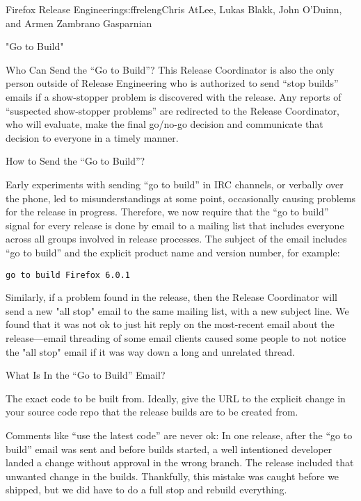 \begin{aosachapter}{Firefox Release Engineering}{s:ffreleng}{Chris AtLee, Lukas Blakk, John O'Duinn, and Armen Zambrano Gasparnian}
\begin{aosasect1}{"Go to Build"}
\begin{aosasect2}{Who Can Send the ``Go to Build''?}
This Release Coordinator is also the only person outside of Release
Engineering who is authorized to send ``stop builds'' emails if a
show-stopper problem is discovered with the release. Any reports of
``suspected show-stopper problems'' are redirected to the Release
Coordinator, who will evaluate, make the final go/no-go decision and
communicate that decision to everyone in a timely manner.

\end{aosasect2}

\begin{aosasect2}{How to Send the ``Go to Build''?}

Early experiments with sending ``go to build'' in IRC channels, or
verbally over the phone, led to misunderstandings at some point,
occasionally causing problems for the release in progress. Therefore,
we now require that the ``go to build'' signal for every release is
done by email to a mailing list that includes everyone across all
groups involved in release processes. The subject of the email
includes ``go to build'' and the explicit product name and version
number, for example:

\begin{verbatim}
go to build Firefox 6.0.1
\end{verbatim}

Similarly, if a problem found in the release, then the Release
Coordinator will send a new "all stop" email to the same mailing list,
with a new subject line. We found that it was not ok to just hit reply
on the most-recent email about the release---email threading of some
email clients caused some people to not notice the "all stop" email if
it was way down a long and unrelated thread.

\end{aosasect2}

\begin{aosasect2}{What Is In the ``Go to Build'' Email?}

\begin{aosaenumerate}

\item The exact code to be built from. Ideally, give the URL to the
explicit change in your source code repo that the release builds are
to be created from.

  \begin{aosaenumerate}

    \item Comments like ``use the latest code'' are never ok: In one
      release, after the ``go to build'' email was sent and before
      builds started, a well intentioned developer landed a change
      without approval in the wrong branch. The release included that
      unwanted change in the builds. Thankfully, this mistake was
      caught before we shipped, but we did have to do a full stop and
      rebuild everything.


\end{aosaenumerate}
\end{aosaenumerate}
\end{aosasect2}
\end{aosasect1}
\end{aosachapter}
